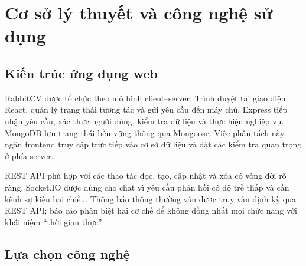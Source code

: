\chapter{Cơ sở lý thuyết và công nghệ sử dụng}

\section{Kiến trúc ứng dụng web}

RabbitCV được tổ chức theo mô hình client--server. Trình duyệt tải giao diện React, quản lý trạng thái tương tác và gửi yêu cầu đến máy chủ. Express tiếp nhận yêu cầu, xác thực người dùng, kiểm tra dữ liệu và thực hiện nghiệp vụ. MongoDB lưu trạng thái bền vững thông qua Mongoose. Việc phân tách này ngăn frontend truy cập trực tiếp vào cơ sở dữ liệu và đặt các kiểm tra quan trọng ở phía server.

REST API phù hợp với các thao tác đọc, tạo, cập nhật và xóa có vòng đời rõ ràng. Socket.IO được dùng cho chat vì yêu cầu phản hồi có độ trễ thấp và cần kênh sự kiện hai chiều. Thông báo thông thường vẫn được truy vấn định kỳ qua REST API; báo cáo phân biệt hai cơ chế để không đồng nhất mọi chức năng với khái niệm ``thời gian thực''.

\section{Lựa chọn công nghệ}

